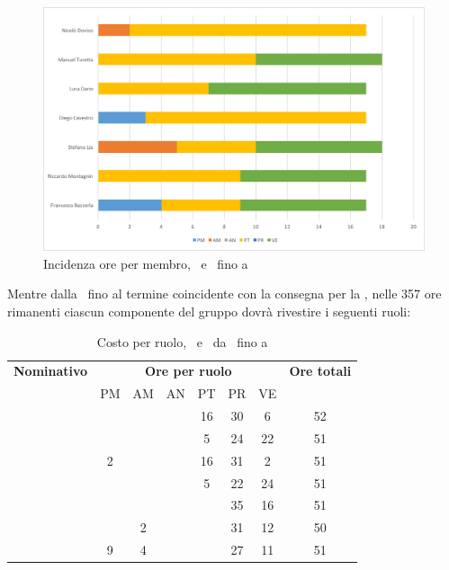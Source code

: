 \begin{figure}[H]
	\centering 
	\includegraphics[scale=0.7]{Immagini/GraficiPianoLavoro/PD.png}
	\caption{Incidenza ore per membro, \PD\ e \COD\ fino a \RP}
\end{figure}

\newpage
Mentre dalla \RP\ fino al termine coincidente con la consegna per la \RQ, nelle 357 ore rimanenti ciascun componente del gruppo dovrà rivestire i seguenti ruoli:

\begin{table}[h]
	\begin{center}
		\begin{tabular}{|c|c|c|c|c|c|c|c|}
			\hline
			\textbf{Nominativo} & \multicolumn{6}{c|}{\textbf{Ore per ruolo}} & \textbf{Ore totali} \\
					& PM & AM & AN & PT & PR & VE & \\
			\hline
			\FB		&	 &	  &	   & 16	& 30 &	6  &	52	\\
			\hline
			\RM		&	 &	  &	   & 5	& 24 & 22 & 51	\\
			\hline
			\SL		& 2  &	  &	   & 16	& 31 & 2  &	51	\\
			\hline
			\DC		&	 &	  &	   & 5	& 22 & 24 &	51	\\
			\hline
			\LD 	&	 &	  &	   &	& 35 & 16 &	51	\\
			\hline
			\MT		& 	 & 2  &	   &	& 31 & 12  &	50	\\
			\hline
			\ND 	& 9	 & 4  &	   & 	& 27 & 11   & 51	\\
			\hline
		\end{tabular}
	\end{center}
	\caption{Costo per ruolo, \PD\ e \COD\ da \RP\ fino a \RQ}
\end{table}

